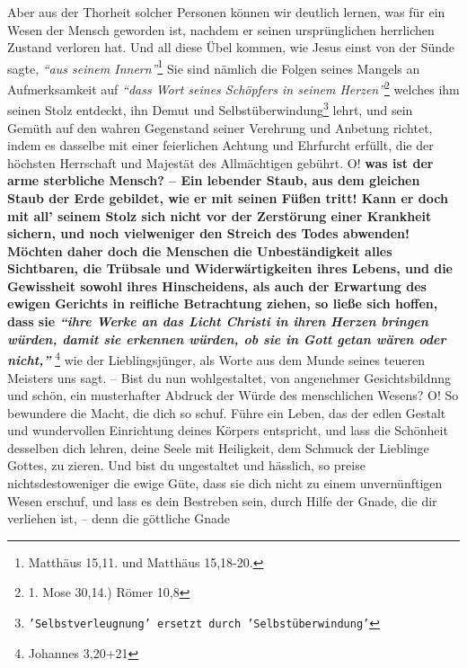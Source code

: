 Aber aus der Thorheit solcher Personen können wir deutlich lernen, was für ein
Wesen der Mensch geworden ist, nachdem er seinen ursprünglichen herrlichen
Zustand verloren hat. Und all diese Übel kommen, wie Jesus einst von der
Sünde
sagte,
\textit{"`aus seinem Innern"'}\footnote{Matthäus 15,11. und Matthäus 15,18-20.}
Sie sind nämlich
die Folgen seines Mangels an Aufmerksamkeit auf
\textit{"`dass Wort seines Schöpfers in
seinem Herzen"'}\footnote{1. Mose 30,14.) Römer 10,8}
welches ihm seinen Stolz
entdeckt, ihn Demut und
Selbstüberwindung\footnote{\texttt{'Selbstverleugnung' ersetzt durch
'Selbstüberwindung'}}
lehrt, und sein Gemüth auf den
wahren Gegenstand seiner Verehrung und Anbetung richtet, indem es dasselbe mit
einer feierlichen Achtung und Ehrfurcht erfüllt, die der höchsten Herrschaft und
Majestät des Allmächtigen gebührt. O!  
 \label{ref:11_10_juengstes_gericht}
\textbf{was ist der arme sterbliche Mensch? --
Ein lebender Staub, aus dem gleichen Staub der Erde gebildet, wie er mit seinen
Füßen tritt! Kann er doch mit all' seinem Stolz sich nicht vor der Zerstörung
einer Krankheit sichern, und noch vielweniger den Streich des Todes abwenden!
Möchten daher doch die Menschen die Unbeständigkeit alles Sichtbaren, die
Trübsale und Widerwärtigkeiten ihres Lebens, und die Gewissheit sowohl ihres
Hinscheidens, als auch der Erwartung des ewigen Gerichts in reifliche
Betrachtung ziehen, so ließe sich hoffen, dass sie
\textit{"`ihre Werke an das Licht
Christi in ihren Herzen bringen würden, damit sie erkennen würden, ob sie in
Gott
getan wären oder nicht,"'} }\footnote{Johannes 3,20+21}
wie der Lieblingsjünger, als
Worte aus dem Munde seines teueren Meisters uns sagt. -- Bist du nun
wohlgestaltet, von angenehmer Gesichtsbildnng und schön, ein musterhafter
Abdruck der Würde des menschlichen Wesens? O! So bewundere die Macht, die dich
so schuf. Führe ein Leben, das der edlen Gestalt und wundervollen Einrichtung
deines Körpers entspricht, und lass die Schönheit desselben dich lehren, deine
Seele mit Heiligkeit, dem Schmuck der
Lieblinge Gottes, zu zieren. Und bist du
ungestaltet und hässlich, so preise nichtsdestoweniger die ewige Güte, dass sie
dich nicht zu einem unvernünftigen Wesen erschuf, und lass es dein Bestreben
sein, durch Hilfe der Gnade, die dir verliehen ist, --  denn die
göttliche Gnade
